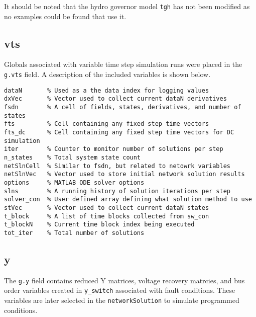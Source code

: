 It should be noted that the hydro governor model \verb|tgh| has not been modified as no examples could be found that use it.

\subsection{vts}  
Globals associated with variable time step simulation runs were placed in the \verb|g.vts| field.
A description of the included variables is shown below.

\begin{verbatim}
dataN       % Used as a the data index for logging values
dxVec       % Vector used to collect current dataN derivatives
fsdn        % A cell of fields, states, derivatives, and number of states
fts         % Cell containing any fixed step time vectors
fts_dc      % Cell containing any fixed step time vectors for DC simulation
iter        % Counter to monitor number of solutions per step
n_states    % Total system state count
netSlnCell  % Similar to fsdn, but related to netowrk variables
netSlnVec   % Vector used to store initial network solution results
options     % MATLAB ODE solver options
slns        % A running history of solution iterations per step
solver_con  % User defined array defining what solution method to use
stVec       % Vector used to collect current dataN states
t_block     % A list of time blocks collected from sw_con
t_blockN    % Current time block index being executed
tot_iter    % Total number of solutions
\end{verbatim}

\pagebreak
\subsection{y}  
The \verb|g.y| field contains reduced Y matrices, voltage recovery matrcies, and bus order variables created in \verb|y_switch| associated with fault conditions.
These variables are later selected in the \verb|networkSolution| to simulate programmed conditions.

\begin{comment}

template for subparagraphs

\subsection{xxx} %
\begin{verbatim}

\end{verbatim}

\end{comment}